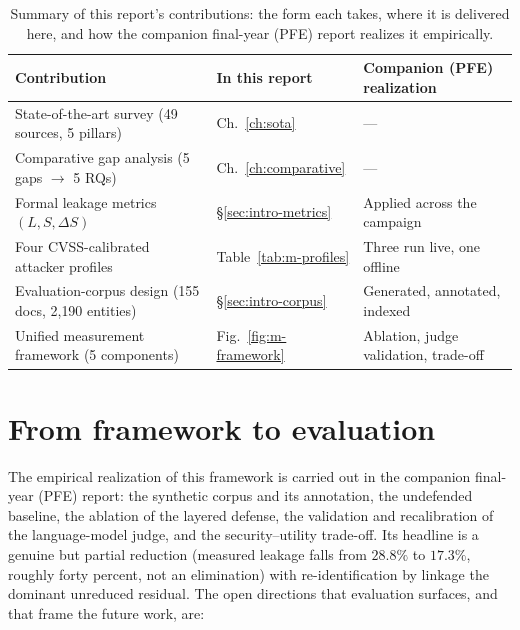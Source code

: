 \documentclass[12pt,a4paper]{report}
\begin{document}
\begin{table}[H]
\centering
\caption{Summary of this report's contributions: the form each takes, where it is delivered here, and
how the companion final-year (PFE) report realizes it empirically.}
\label{tab:concl-contrib}
\small
\begin{tabularx}{\textwidth}{@{}llL@{}}
\toprule
\textbf{Contribution} & \textbf{In this report} & \textbf{Companion (PFE) realization} \\
\midrule
State-of-the-art survey (49 sources, 5 pillars)        & Ch.~\ref{ch:sota}             & --- \\
Comparative gap analysis (5 gaps $\rightarrow$ 5 RQs)  & Ch.~\ref{ch:comparative}      & --- \\
Formal leakage metrics $(L, S, \Delta S)$              & \S\ref{sec:intro-metrics}     & Applied across the campaign \\
Four CVSS-calibrated attacker profiles                 & Table~\ref{tab:m-profiles}    & Three run live, one offline \\
Evaluation-corpus design (155 docs, 2{,}190 entities)  & \S\ref{sec:intro-corpus}      & Generated, annotated, indexed \\
Unified measurement framework (5 components)           & Fig.~\ref{fig:m-framework}    & Ablation, judge validation, trade-off \\
\bottomrule
\end{tabularx}
\end{table}

\section{From framework to evaluation}
\label{sec:concl-future}

The empirical realization of this framework is carried out in the companion final-year (PFE)
report: the synthetic corpus and its annotation, the undefended baseline, the ablation of the
layered defense, the validation and recalibration of the language-model judge, and the
security--utility trade-off. Its headline is a genuine but partial reduction (measured leakage
falls from $28.8\%$ to $17.3\%$, roughly forty percent, not an elimination) with
re-identification by linkage the dominant unreduced residual. The open directions that evaluation
surfaces, and that frame the future work, are:
\end{document}
